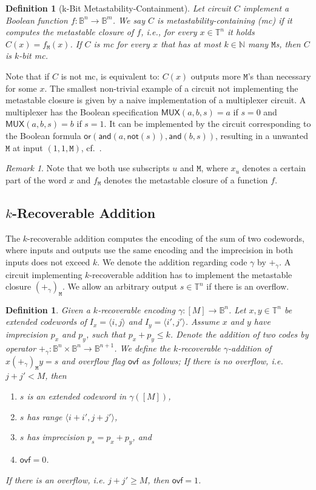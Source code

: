 \documentclass[9pt,journal,compsoc]{IEEEtran}
\newtheorem{definition}[theorem]{Definition}
\theoremstyle{remark}
\newtheorem*{remark}{Remark}
\newcommand{\ovf}{\textsf{ovf}}
\newcommand{\mfu}{\mathtt{M}}
\newcommand{\IN}{\mathbb{N}}
\newcommand{\IB}{\mathbb{B}}
\newcommand{\IT}{\mathbb{T}}
\newcommand{\AND}{\textsf{and}}
\newcommand{\OR}{\textsf{or}}
\newcommand{\NOT}{\textsf{not}}
\newcommand{\MUX}{\textsf{MUX}}
\newcommand{\ang}[1]{\langle{#1}\rangle}
\newcommand{\intvl}[1]{\ang{#1}}
\begin{document}
\begin{definition}[k-Bit Metastability-Containment]
  Let circuit $C$ implement a Boolean function $f\colon\IB^n\to\IB^m$.
  We say $C$ is metastability-containing (mc) if it computes the metastable
    closure of $f$, i.e., for every $x\in\IT^n$ it holds $C(x)=f_{\mfu}(x)$.
  If $C$ is mc for every $x$ that has at most 
    $k\in\IN$ many $\mfu$s, then $C$ is $k$-bit mc.
\end{definition}

Note that if $C$ is not mc, is equivalent to: $C(x)$ outputs more
$\mfu$'s than necessary for some $x$.
The smallest non-trivial example of a circuit not implementing the metastable closure 
is given by a naive
implementation of a multiplexer circuit. A multiplexer has the Boolean
specification $\MUX(a,b,s)=a$ if $s=0$ and $\MUX(a,b,s)=b$ if $s=1$. It can be
implemented by the circuit corresponding to the Boolean formula
$\OR(\AND(a,\NOT(s)),\AND(b,s))$, resulting in a unwanted $\mfu$ at input
$(1,1,\mfu)$, cf.~\cite{ikenmeyer18complexity}.

\begin{remark}
  Note that we both use subscripts $u$ and $\mfu$, where $x_u$ denotes a certain
    part of the word $x$ and $f_\mfu$ denotes the metastable closure of a function $f$.
\end{remark}

\subsection{\texorpdfstring{$k$}{k}-Recoverable Addition}
The $k$-recoverable addition computes the encoding of the sum
  of two codewords, where inputs and outputs use the same encoding
  and the imprecision in both inputs does not exceed $k$.
We denote the addition regarding code $\gamma$ by $+_{\gamma}$.
A circuit implementing $k$-recoverable addition has to implement
  the metastable closure $(+_\gamma)_\mfu$.
We allow an arbitrary output $s\in\IT^n$ if there is an overflow.

\begin{definition}\label{lem:addition}
  Given a $k$-recoverable encoding $\gamma\colon[M]\rightarrow\IB^n$.
  Let $x,y\in\IT^n$ be extended codewords of $I_x=\intvl{i,j}$ and $I_y=\intvl{i',j'}$.
  Assume $x$ and $y$ have imprecision $p_x$ and $p_y$, such that $p_x + p_y \leq k$.
  Denote the addition of two codes by operator $+_\gamma\colon\IB^n\times\IB^n\rightarrow\IB^{n+1}$.
  We define the $k$-recoverable $\gamma$-addition of $x (+_\gamma)_\mfu y=s$ and overflow flag $\ovf$ as follows;
  If there is no overflow, i.e. $j+j'<M$, then 
  \begin{enumerate}
    \item $s$ is an extended codeword in $\gamma([M])$,
    \item $s$ has range $\intvl{i+i',j+j'}$,
    \item $s$ has imprecision $p_s = p_x + p_y$, and
    \item $\ovf=0$.
  \end{enumerate}
  If there is an overflow, i.e. $j+j'\geq M$, then $\ovf=1$.
\end{definition}
\end{document}
